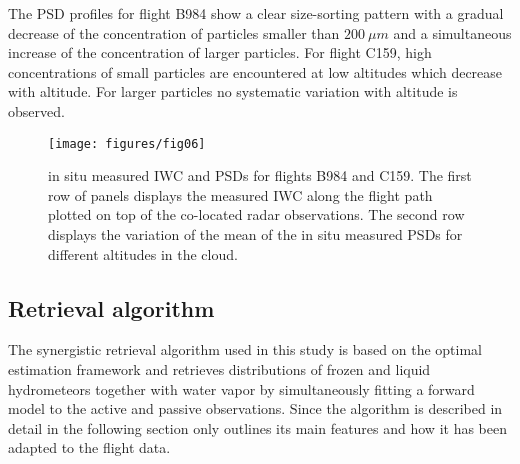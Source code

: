 \documentclass[journal abbreviation, manuscript]{copernicus}
\begin{document}
The PSD profiles for flight B984 show a clear size-sorting pattern with a
gradual decrease of the concentration of particles smaller than $200\ \unit{\mu
  m}$ and a simultaneous increase of the concentration of larger particles. For
flight C159, high concentrations of small particles are encountered at low
altitudes which decrease with altitude. For larger particles no systematic
variation with altitude is observed.

\begin{figure}[hbpt!]
  \centering
  \texttt{[image: figures/fig06]}
  \caption{ in situ measured IWC and PSDs for flights B984 and C159. The first
    row of panels displays the measured IWC along the flight path plotted on top
    of the co-located radar observations. The second row displays the variation
    of the mean of the in situ measured PSDs for different altitudes in the
    cloud.
    }
  \label{fig:in_situ}
\end{figure}

\subsection{Retrieval algorithm}
\label{sec:synergistic_retrieval}

The synergistic retrieval algorithm used in this study is based on the optimal
estimation framework \citep{rodgers00} and retrieves distributions of frozen and
liquid hydrometeors together with water vapor by simultaneously fitting a
forward model to the active and passive observations. Since the algorithm is
described in detail in \citet{pfreundschuh20} the following section only
outlines its main features and how it has been adapted to the flight data.
\end{document}

